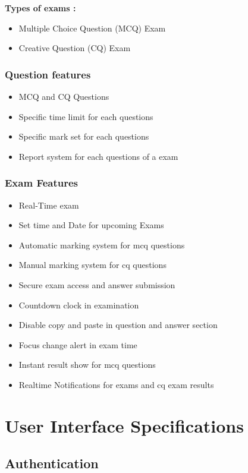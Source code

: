 \documentclass[10pt]{article}
\begin{document}
\textbf{Types of exams :}

\begin{itemize}
  \item Multiple Choice Question (MCQ) Exam

  \item Creative Question (CQ) Exam
\end{itemize}

\subsubsection{Question features}

\begin{itemize}
  \item MCQ and CQ Questions
  \item Specific time limit for each questions
  \item Specific mark set for each questions
  \item Report system for each questions of a exam
\end{itemize}

\subsubsection{Exam Features}

\begin{itemize}
  \item Real-Time exam
  \item Set time and Date for upcoming Exams
  \item Automatic marking system for mcq questions
  \item Manual marking system for cq questions
  \item Secure exam access and answer submission
  \item Countdown clock in examination
  \item Disable copy and paste in question and answer section
  \item Focus change alert in exam time
  \item Instant result show for mcq questions
  \item Realtime Notifications for exams and cq exam results
\end{itemize}

\section{User Interface Specifications}
\subsection{Authentication}
\end{document}
